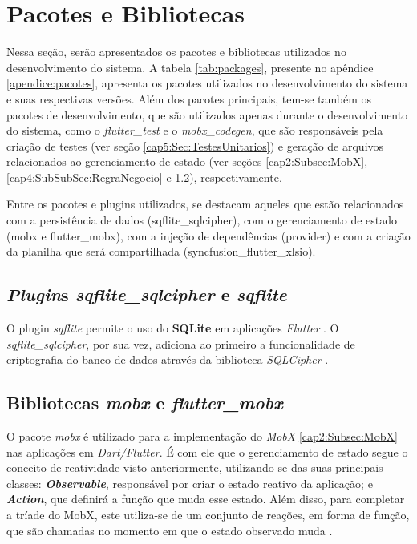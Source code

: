 \section{Pacotes e Bibliotecas}
\label{cap4:Sec:PacotesBibliotecas}

Nessa seção, serão apresentados os pacotes e bibliotecas utilizados no desenvolvimento do sistema. A tabela \ref{tab:packages}, presente no apêndice \ref{apendice:pacotes}, apresenta os pacotes utilizados no desenvolvimento do sistema e suas respectivas versões. Além dos pacotes principais, tem-se também os pacotes de desenvolvimento, que são utilizados apenas durante o desenvolvimento do sistema, como o \textit{flutter\_test} e o \textit{mobx\_codegen}, que são responsáveis pela criação de testes (ver seção \ref{cap5:Sec:TestesUnitarios}) e geração de arquivos relacionados ao gerenciamento de estado (ver seções \ref{cap2:Subsec:MobX}, \ref{cap4:SubSubSec:RegraNegocio} e \ref{cap4:Subsec:mobx-package}), respectivamente.

Entre os pacotes e plugins utilizados, se destacam aqueles que estão relacionados com a persistência de dados (sqflite\_sqlcipher), com o gerenciamento de estado (mobx e flutter\_mobx), com a injeção de dependências (provider) e com a criação da planilha que será compartilhada (syncfusion\_flutter\_xlsio).

\subsection{\textit{Plugin}s \textit{sqflite\_sqlcipher} e \textit{sqflite}}
\label{cap4:Subsec:sqflite-sqlcipher-package}
O plugin \textit{sqflite} permite o uso do \textbf{SQLite} em aplicações \textit{Flutter} \cite{sqflite-package}. O \textit{sqflite\_sqlcipher}, por sua vez, adiciona ao primeiro a funcionalidade de criptografia do banco de dados através da biblioteca \textit{SQLCipher} \cite{sqlcipher-package}.

\subsection{Bibliotecas \textit{mobx} e \textit{flutter\_mobx}}
\label{cap4:Subsec:mobx-package}
O pacote \textit{mobx} é utilizado para a implementação do \textit{MobX} \ref{cap2:Subsec:MobX} nas aplicações em \textit{Dart/Flutter}. É com ele que o gerenciamento de estado segue o conceito de reatividade visto anteriormente, utilizando-se das suas principais classes: \textit{\textbf{Observable}}, responsável por criar o estado reativo da aplicação; e \textit{\textbf{Action}}, que definirá a função que muda esse estado. Além disso, para completar a tríade do MobX, este utiliza-se de um conjunto de reações, em forma de função, que são chamadas no momento em que o estado observado muda \cite{mobx-package}.

